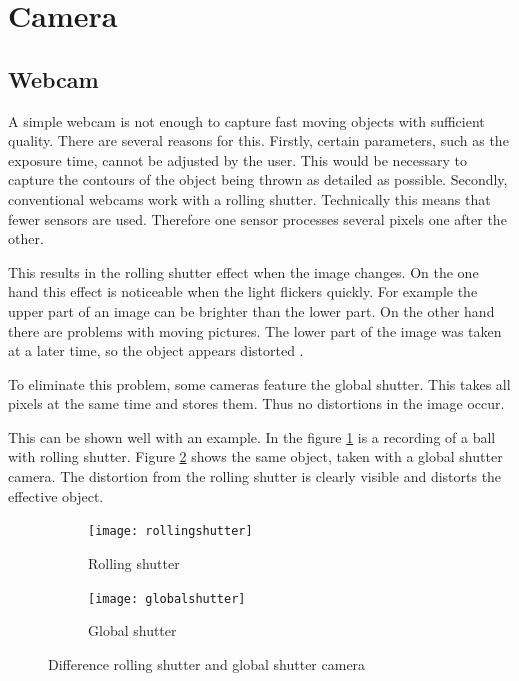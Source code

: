 \section{Camera}
\label{sec:camera}
\subsection{Webcam}
\label{subsec:webcam}
A simple webcam is not enough to capture fast moving objects with sufficient quality. 
There are several reasons for this.
Firstly, certain parameters, such as the exposure time, cannot be adjusted by the user.
This would be necessary to capture the contours of the object being thrown as detailed as possible.
Secondly, conventional webcams work with a rolling shutter.
Technically this means that fewer sensors are used. Therefore one sensor processes several pixels one after the other.

This results in the rolling shutter effect when the image changes.
On the one hand this effect is noticeable when the light flickers quickly.
For example the upper part of an image can be brighter than the lower part.
On the other hand there are problems with moving pictures.
The lower part of the image was taken at a later time, so the object appears distorted \cite{global_rolling_shutter}.

To eliminate this problem, some cameras feature the global shutter. 
This takes all pixels at the same time and stores them. 
Thus no distortions in the image occur.

This can be shown well with an example.
In the figure \ref{subfig:rollingshutter} is a recording of a ball with rolling shutter. 
Figure \ref{subfig:globalshutter} shows the same object, taken with a global shutter camera.
The distortion from the rolling shutter is clearly visible and distorts the effective object.

\begin{figure}[ht]
	\centering
	\begin{subfigure}[b]{0.4\textwidth}
		\centering
		\texttt{[image: rollingshutter]}
		\caption{Rolling shutter}
		\label{subfig:rollingshutter}
	\end{subfigure}
	\begin{subfigure}[b]{0.4\textwidth}
		\centering
		\texttt{[image: globalshutter]}
		\caption{Global shutter}
		\label{subfig:globalshutter}
	\end{subfigure}
	\caption{Difference rolling shutter and global shutter camera \cite{shuttermode}}
	\label{fig:shuttermode}
\end{figure}

